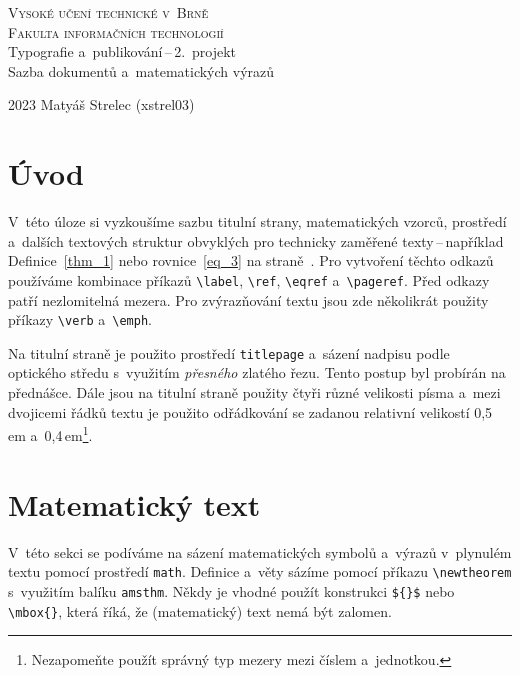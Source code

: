\documentclass[11pt, twocolumn, a4paper]{article}
\begin{document}
\begin{titlepage}
	\begin{center}
		\textsc{
			\Huge{Vysoké učení technické v~Brně}\\[0.1em]
			\huge{Fakulta informačních technologií\\}
		}
		\LARGE{
			Typografie a~publikování\,{}--\,{}2.\ projekt\\[0.1em]
			Sazba dokumentů a~matematických výrazů\\
		}
	\end{center}
	{\Large{
		2023
		\hfill
		Matyáš Strelec (xstrel03)
		}
	}
\end{titlepage}

\newpage

\label{1}

\section*{Úvod}
V~této úloze si vyzkoušíme sazbu titulní strany, matematických vzorců, prostředí
a~dalších textových struktur obvyklých pro technicky zaměřené texty\,{}--\,{}například
Definice~\ref{thm_1} nebo rovnice~\eqref{eq_3} na straně~\pageref{1}. Pro vytvoření těchto
odkazů používáme kombinace příkazů \verb|\label|, \verb|\ref|, \verb|\eqref| a~\verb|\pageref|. Před odkazy
patří nezlomitelná mezera. Pro zvýrazňování textu jsou zde několikrát použity příkazy
\verb|\verb| a~\verb|\emph|.

Na titulní straně je použito prostředí \verb|titlepage| a~sázení nadpisu podle optického středu s~využitím \emph{přesného}
zlatého řezu. Tento postup byl probírán na přednášce. Dále jsou na titulní straně použity čtyři různé velikosti písma a~mezi
dvojicemi řádků textu je použito odřádkování se zadanou relativní velikostí 0,5\,em a~0,4\,em\footnote{Nezapomeňte použít správný typ mezery mezi číslem a~jednotkou.}.

\section{Matematický text}
V~této sekci se podíváme na sázení matematických symbolů a~výrazů v~plynulém textu pomocí prostředí \verb|math|. 
Definice a~věty sázíme pomocí příkazu \verb|\newtheorem| s~využitím balíku \verb|amsthm|. Někdy je vhodné použít konstrukci \verb|${}$|
nebo \verb|\mbox{}|, která říká, že (matematický) text nemá být zalomen.
\end{document}
